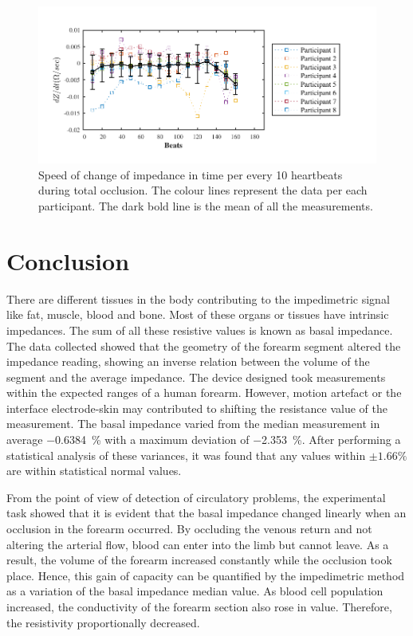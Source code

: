 \begin{figure}[htbp]
	\centering
	\includegraphics[width=15cm,keepaspectratio]{figure_vop_9}    
	\caption[Rate of change of impedance per 10 heartbeats during total occlusion]{Speed of change of impedance in time per every 10 heartbeats during total occlusion. The colour lines represent the data per each participant. The dark bold line is the mean of all the measurements.}
	\label{fig:total occlusion change}
\end{figure} 

\section{Conclusion}
\label{senction basal conclusion} 

There are different tissues in the body contributing to the impedimetric signal like fat, muscle, blood and bone. Most of these organs or tissues have intrinsic impedances. The sum of all these resistive values is known as basal impedance. The data collected showed that the geometry of the forearm segment altered the impedance reading, showing an inverse relation between the volume of the segment and the average impedance. The device designed took measurements within the expected ranges of a human forearm. However, motion artefact or the interface electrode-skin may contributed to shifting the resistance value of the measurement. The basal impedance varied from the median measurement in average \SI{-0.6384}{\percent} with a maximum deviation of \SI{-2.353}{\percent}. After performing a statistical analysis of these variances, it was found that any values within $\pm 1.66 \%$ are within statistical normal values. 

From the point of view of detection of circulatory problems, the experimental task showed that it is evident that the basal impedance changed linearly when an occlusion in the forearm occurred. By occluding the venous return and not altering the arterial flow, blood can enter into the limb but cannot leave. As a result, the volume of the forearm increased constantly while the occlusion took place. Hence, this gain of capacity can be quantified by the impedimetric method as a variation of the basal impedance median value. As blood cell population increased, the conductivity of the forearm section also rose in value. Therefore, the resistivity proportionally decreased.


